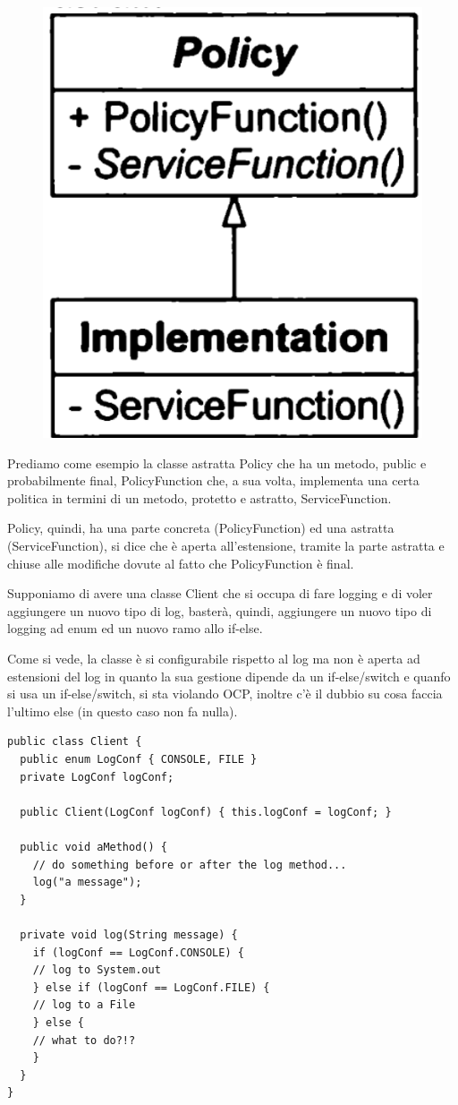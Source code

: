 \begin{figure}
  \includegraphics[width=0.5\linewidth]{../../immagini/principio_SOLID/esempioOCP}  
\end{figure}

Prediamo come esempio la classe astratta Policy che ha un metodo, public e probabilmente final, PolicyFunction che, a sua volta, implementa una certa politica in termini di un metodo, protetto e 
astratto, ServiceFunction.

Policy, quindi, ha una parte concreta (PolicyFunction) ed una astratta (ServiceFunction), si dice che è aperta all'estensione, tramite la parte astratta e chiuse alle modifiche dovute al fatto 
che PolicyFunction è final.

Supponiamo di avere una classe Client che si occupa di fare logging e di voler aggiungere un nuovo tipo di log, basterà, quindi, aggiungere un nuovo tipo di logging ad enum ed un nuovo ramo allo if-else.

Come si vede, la classe è si configurabile rispetto al log ma non è aperta ad estensioni del log in quanto la sua gestione dipende da un if-else/switch e quanfo si usa un if-else/switch, si sta violando 
OCP, inoltre c'è il dubbio su cosa faccia l'ultimo else (in questo caso non fa nulla).

\begin{lstlisting}[linewidth=10cm]
public class Client {
  public enum LogConf { CONSOLE, FILE }
  private LogConf logConf;
  
  public Client(LogConf logConf) { this.logConf = logConf; }
  
  public void aMethod() {
    // do something before or after the log method...
    log("a message");
  }

  private void log(String message) {
    if (logConf == LogConf.CONSOLE) {
    // log to System.out
    } else if (logConf == LogConf.FILE) {
    // log to a File
    } else {
    // what to do?!?
    }
  }
}
\end{lstlisting}

